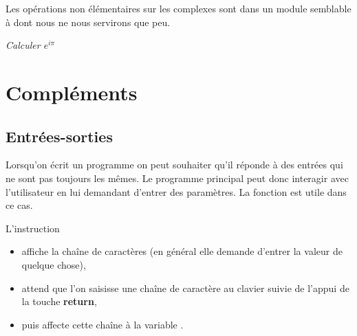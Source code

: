 \medskip


Les opérations non élémentaires sur les complexes sont dans un module  semblable à  dont nous ne nous servirons que peu. 
\begin{Exercise}
{\it Calculer $e^{i\pi}$}
\end{Exercise}
\section{Compléments}
\subsection{Entrées-sorties}

Lorsqu'on écrit un programme on peut souhaiter qu'il réponde à des entrées qui ne sont pas toujours les mêmes. Le programme principal peut donc interagir avec l'utilisateur en lui demandant d'entrer des paramètres. La fonction  est utile dans ce cas.

L'instruction  
\begin{itemize}

\item affiche la chaîne de caractères  (en général elle demande d'entrer la valeur de quelque chose),
\item attend que l'on saisisse une chaîne de caractère au clavier suivie de l'appui de la touche {\bf return},
\item puis affecte cette chaîne à la variable .
\end{itemize}


